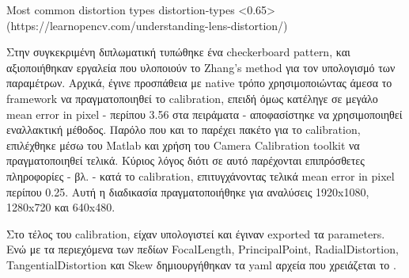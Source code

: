 %
{Most common distortion types}%
{distortion-types}%
<0.65>%
(https://learnopencv.com/understanding-lens-distortion/)

Στην συγκεκριμένη διπλωματική τυπώθηκε ένα checkerboard pattern, και α\-ξιο\-ποιή\-θη\-καν εργαλεία που υλοποιούν το Zhang's method για τον υπολογισμό των πα\-ρα\-μέ\-τρων. Αρχικά, έγινε προσπάθεια με native τρόπο χρησιμοποιώντας άμεσα το framework  να πραγματοποιηθεί το calibration, επειδή όμως κατέληγε σε μεγάλο mean error in pixel - περίπου 3.56 στα πειράματα - αποφασίστηκε να χρησιμοποιηθεί εναλλακτική μέθοδος. Παρόλο που και το  παρέχει πακέτο για το calibration, επιλέχθηκε μέσω του Matlab και χρήση του Camera Calibration toolkit να πραγματοποιηθεί τελικά. Κύριος λόγος διότι σε αυτό παρέχονται επιπρόσθετες πληροφορίες - βλ.  - κατά το calibration, επιτυγχάνοντας τελικά mean error in pixel περίπου 0.25. Αυτή η διαδικασία πραγματοποιήθηκε για αναλύσεις 1920x1080, 1280x720 και 640x480. 

Στο τέλος του calibration, είχαν υπολογιστεί και έγιναν exported τα parameters. Ενώ με τα περιεχόμενα των πεδίων FocalLength, PrincipalPoint, RadialDistortion, TangentialDistortion και Skew δημιουργήθηκαν τα yaml αρχεία που χρειάζεται το  \cite{ros-calibration-instr1} \cite{ros-calibration-instr2}.


